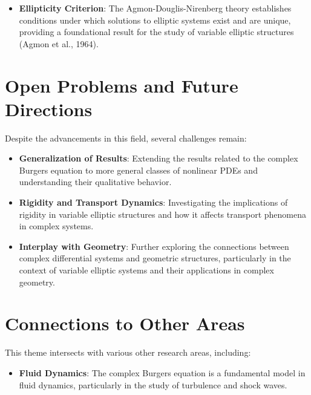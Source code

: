 \documentclass[11pt,a4paper]{article}
\begin{document}
\begin{itemize}
\item \textbf{Ellipticity Criterion}: The Agmon-Douglis-Nirenberg theory establishes conditions under which solutions to elliptic systems exist and are unique, providing a foundational result for the study of variable elliptic structures (Agmon et al., 1964).
\end{itemize}

\section{Open Problems and Future Directions}

Despite the advancements in this field, several challenges remain:

\begin{itemize}
\item \textbf{Generalization of Results}: Extending the results related to the complex Burgers equation to more general classes of nonlinear PDEs and understanding their qualitative behavior.
\end{itemize}

\begin{itemize}
\item \textbf{Rigidity and Transport Dynamics}: Investigating the implications of rigidity in variable elliptic structures and how it affects transport phenomena in complex systems.
\end{itemize}

\begin{itemize}
\item \textbf{Interplay with Geometry}: Further exploring the connections between complex differential systems and geometric structures, particularly in the context of variable elliptic systems and their applications in complex geometry.
\end{itemize}

\section{Connections to Other Areas}

This theme intersects with various other research areas, including:

\begin{itemize}
\item \textbf{Fluid Dynamics}: The complex Burgers equation is a fundamental model in fluid dynamics, particularly in the study of turbulence and shock waves.
\end{itemize}
\end{document}
